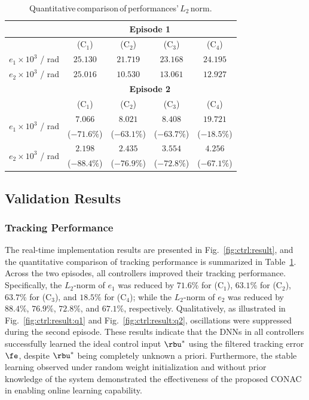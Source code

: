\documentclass[letterpaper, journal]{IEEEtran}
\begin{document}
\begin{table}[!t]
    \renewcommand{\arraystretch}{1.3}
    \caption{Quantitative\,comparison\,of\,performances'\,$L_2$\,norm.}
    \centering
    \begin{tabular}{c c c c c}
    \hline
		& \multicolumn{4}{c}{\textbf{Episode 1}} \\
    \hline
	\hline 
		& (C$_1$) & (C$_2$) & (C$_3$) & (C$_4$) \\
	\hline
		$e_1\times10^{3}$ / rad & $25.130$ & $21.719$ & $23.168$ & $24.195$ \\ 
	\hline
        $e_2\times10^{3}$ / rad & $25.016$ & $10.530$ & $13.061$ & $12.927$ \\
	\hline
        & \multicolumn{4}{c}{\textbf{Episode 2}} \\
    \hline
    \hline
        & (C$_1$) & (C$_2$) & (C$_3$) & (C$_4$) \\
	\hline
    \multirow{2}{*}{$e_1\times10^{3}$ / rad} 
        & $7.066$ & $8.021$ & $8.408$ & $19.721$ \\
        & ($-71.6\%$) & ($-63.1\%$) & ($-63.7\%$) & ($-18.5\%$) \\
    \hline
    \multirow{2}{*}{$e_2\times10^{3}$ / rad} 
        & $2.198$ & $2.435$ & $3.554$ & $4.256$ \\
        & ($-88.4\%$) & ($-76.9\%$) & ($-72.8\%$) & ($-67.1\%$) \\
    \hline
    \end{tabular}
    \label{tab:sim:L2}
\end{table}

\subsection{Validation Results}

\subsubsection{Tracking Performance}

The real-time implementation results are presented in Fig.~\ref{fig:ctrl:result}, and the quantitative comparison of tracking performance is summarized in Table~\ref{tab:sim:L2}.
Across the two episodes, all controllers improved their tracking performance. 
Specifically, the $L_2$-norm of $e_1$ was reduced by $71.6 \%$ for (C$_1$), $63.1 \%$ for (C$_2$), $63.7 \%$ for (C$_3$), and $18.5 \%$ for (C$_4$); while the $L_2$-norm of $e_2$ was reduced by $88.4 \%$, $76.9 \%$, $72.8 \%$, and $67.1 \%$, respectively.
Qualitatively, as illustrated in Fig.~\ref{fig:ctrl:result:q1} and Fig.~\ref{fig:ctrl:result:q2}, oscillations were suppressed during the second episode.
These results indicate that the DNNs in all controllers successfully learned the ideal control input $\rbu^*$ using the filtered tracking error $\fe$, despite $\rbu^*$ being completely unknown a priori.
Furthermore, the stable learning observed under random weight initialization and without prior knowledge of the system demonstrated the effectiveness of the proposed CONAC in enabling online learning capability.
\end{document}
